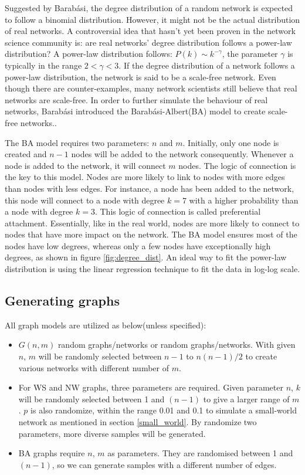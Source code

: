 \documentclass[12pt]{article}
\begin{document}
Suggested by Barabási\cite{barabási2016network}, the degree distribution of a random network is expected to follow a binomial distribution. However, it might not be the actual distribution of real networks. A controversial idea that hasn't yet been proven in the network science community is: are real networks' degree distribution follows a power-law distribution? A power-law distribution follows: $P(k) \sim k^{-\gamma }$, the parameter $\gamma$ is typically in the range $2<\gamma<3$. If the degree distribution of a network follows a power-law distribution, the network is said to be a scale-free network. Even though there are counter-examples\cite{broido_clauset_2019}, many network scientists still believe that real networks are scale-free\cite{albert1999diameter}. In order to further simulate the behaviour of real networks, Barabási introduced the Barabási-Albert(BA) model to create scale-free networks.\cite{barabási2016network}.\par
The BA model requires two parameters: $n$ and $m$. Initially, only one node is created and $n-1$ nodes will be added to the network consequently. Whenever a node is added to the network, it will connect $m$ nodes. The logic of connection is the key to this model. Nodes are more likely to link to nodes with more edges than nodes with less edges. For instance, a node has been added to the network, this node will connect to a node with degree $k=7$ with a higher probability than a node with degree $k=3$. This logic of connection is called preferential attachment. Essentially, like in the real world, nodes are more likely to connect to nodes that have more impact on the network.\cite{pa_test} The BA model ensures most of the nodes have low degrees, whereas only a few nodes have exceptionally high degrees, as shown in figure \ref{fig:degree_dist}. An ideal way to fit the power-law distribution is using the linear regression technique to fit the data in log-log scale.

\subsection{Generating graphs}
\label{generate_graphs}
All graph models are utilized as below(unless specified):
\begin{itemize}
    \item $G(n,m)$ random graphs/networks or random graphs/networks. With given $n$, $m$ will be randomly selected between $n-1$ to $n(n-1)/2$ to create various networks with different number of $m$.
    \item For WS and NW graphs, three parameters are required. Given parameter $n$, $k$ will be randomly selected between 1 and $(n-1)$ to give a larger range of $m$. $p$ is also randomize, within the range 0.01 and 0.1 to simulate a small-world network as mentioned in section \ref{small_world}. By randomize two parameters, more diverse samples will be generated.
    \item BA graphs require $n$, $m$ as parameters. They are randomised between 1 and $(n-1)$, so we can generate samples with a different number of edges.
\end{itemize}
\end{document}
